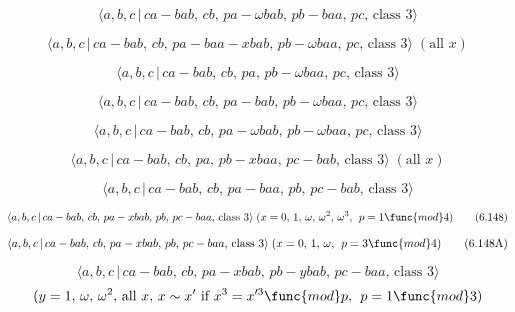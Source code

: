 \documentclass[10pt]{article}
\begin{document}
\begin{equation}
\langle a,b,c\,|\,ca-bab,\,cb,\,pa-\omega bab,\,pb-baa,\,pc,\,\text{class }%
3\rangle  \tag{6.141}
\end{equation}

\begin{equation}
\langle a,b,c\,|\,ca-bab,\,cb,\,pa-baa-xbab,\,pb-\omega baa,\,pc,\,\text{
class }3\rangle\;(\text{all }x)  \tag{6.142}
\end{equation}

\begin{equation}
\langle a,b,c\,|\,ca-bab,\,cb,\,pa,\,pb-\omega baa,\,pc,\,\text{class }%
3\rangle  \tag{6.143}
\end{equation}

\begin{equation}
\langle a,b,c\,|\,ca-bab,\,cb,\,pa-bab,\,pb-\omega baa,\,pc,\,\text{class }%
3\rangle  \tag{6.144}
\end{equation}

\begin{equation}
\langle a,b,c\,|\,ca-bab,\,cb,\,pa-\omega bab,\,pb-\omega baa,\,pc,\,\text{
class }3\rangle  \tag{6.145}
\end{equation}

\begin{equation}
\langle a,b,c\,|\,ca-bab,\,cb,\,pa,\,pb-xbaa,\,pc-bab,\,\text{class }%
3\rangle\;(\text{all }x)  \tag{6.146}
\end{equation}

\begin{equation}
\langle a,b,c\,|\,ca-bab,\,cb,\,pa-baa,\,pb,\,pc-bab,\,\text{class }3\rangle
\tag{6.147}
\end{equation}

\begin{equation}
\langle a,b,c\,|\,ca-bab,\,cb,\,pa-xbab,\,pb,\,pc-baa,\,\text{class }%
3\rangle\;(x=0,\,1,\,\omega ,\,\omega ^2,\,\omega ^3,\,\;p=1 \func{mod} 4) 
\tag{6.148}
\end{equation}

\begin{equation}
\langle a,b,c\,|\,ca-bab,\,cb,\,pa-xbab,\,pb,\,pc-baa,\,\text{class }%
3\rangle\;(x=0,\,1,\,\omega ,\,\;p=3 \func{mod} 4)  \tag{6.148A}
\end{equation}

\begin{equation}
\langle a,b,c\,|\,ca-bab,\,cb,\,pa-xbab,\,pb-ybab,\,pc-baa,\,\text{class }%
3\rangle  \tag{6.149}
\end{equation}%
\[
(y=1,\,\omega ,\,\omega ^{2},\,\text{all }x,\,x\sim x^{\prime }\text{ if }%
x^{3}=x^{\prime 3}\func{mod}p,\,\;p=1\func{mod}3) 
\]
\end{document}

